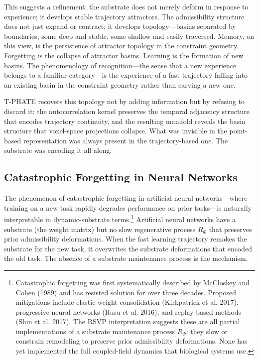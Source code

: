 \documentclass[12pt,a4paper]{article}
\begin{document}
This suggests a refinement: the substrate does not merely deform in response to experience; it develops stable trajectory attractors. The admissibility structure does not just expand or contract; it develops topology---basins separated by boundaries, some deep and stable, some shallow and easily traversed. Memory, on this view, is the persistence of attractor topology in the constraint geometry. Forgetting is the collapse of attractor basins. Learning is the formation of new basins. The phenomenology of recognition---the sense that a new experience belongs to a familiar category---is the experience of a fast trajectory falling into an existing basin in the constraint geometry rather than carving a new one.

T-PHATE recovers this topology not by adding information but by refusing to discard it: the autocorrelation kernel preserves the temporal adjacency structure that encodes trajectory continuity, and the resulting manifold reveals the basin structure that voxel-space projections collapse. What was invisible in the point-based representation was always present in the trajectory-based one. The substrate was encoding it all along.

\subsection{Catastrophic Forgetting in Neural Networks}

The phenomenon of catastrophic forgetting in artificial neural networks---where training on a new task rapidly degrades performance on prior tasks---is naturally interpretable in dynamic-substrate terms.\footnote{Catastrophic forgetting was first systematically described by McCloskey and Cohen (1989) and has resisted solution for over three decades. Proposed mitigations include elastic weight consolidation (Kirkpatrick et al. 2017), progressive neural networks (Rusu et al. 2016), and replay-based methods (Shin et al. 2017). The RSVP interpretation suggests these are all partial implementations of a substrate maintenance process $R_\Phi$: they slow or constrain remodeling to preserve prior admissibility deformations. None has yet implemented the full coupled-field dynamics that biological systems use.} Artificial neural networks have a substrate (the weight matrix) but no slow regenerative process $R_\Phi$ that preserves prior admissibility deformations. When the fast learning trajectory remakes the substrate for the new task, it overwrites the substrate deformations that encoded the old task. The absence of a substrate maintenance process is the mechanism.
\end{document}
